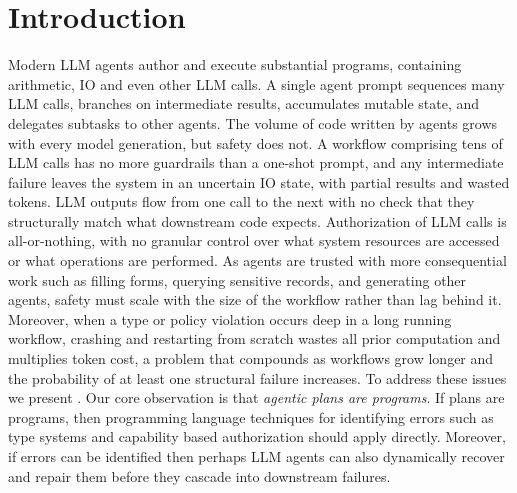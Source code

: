 \section{Introduction}
\label{sec:intro}

Modern LLM agents author and execute substantial programs, containing arithmetic, IO and even other LLM calls.
A single agent prompt sequences many LLM calls, branches on intermediate results, accumulates
mutable state, and delegates subtasks to other agents. The volume of
code written by agents grows with every model generation, but safety
does not. A workflow comprising tens of LLM calls has no more guardrails
than a one-shot prompt, and any intermediate failure leaves the system
in an uncertain IO state, with partial results and wasted tokens. LLM outputs
flow from one call to the next with no check that they structurally match
what downstream code expects. Authorization of LLM calls is all-or-nothing, 
with no granular control over what system resources are accessed or what operations are performed.
As agents are trusted with more consequential work such as filling
forms, querying sensitive records, and generating other agents, safety
must scale with the size of the workflow rather than lag behind it.
Moreover, when a type or policy violation occurs deep in a long running
workflow, crashing and restarting from scratch wastes all prior
computation and multiplies token cost, a problem that compounds as
workflows grow longer and the probability of at least one structural
failure increases. To address these issues we present \sys. 
Our core observation is that \emph{agentic plans are programs}. If plans are programs, then programming
language techniques for identifying errors such as type systems and capability based
authorization should apply directly. Moreover, if errors can be identified
then perhaps LLM agents can also dynamically recover and repair them before
they cascade into downstream failures.

